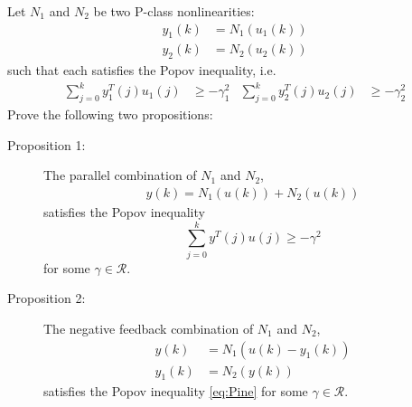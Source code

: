 \item
Let $N_1$ and $N_2$ be two P-class nonlinearities:
\begin{align*}
    y_1(k) & = N_1(u_1(k))\\
    y_2(k) & = N_2(u_2(k))
\end{align*}
such that each satisfies the Popov inequality, i.e.
\begin{align*}
    \sum_{j=0}^k y_1^T(j)u_1(j) & \geq - \gamma_1^2
        & \sum_{j=0}^k y_2^T(j)u_2(j) & \geq  - \gamma_2^2
\end{align*}
Prove the following two propositions:
\begin{description}
    \item[Proposition 1:]
    The parallel combination of $N_1$ and $N_2$,
    \begin{align*}
    y(k) = N_1(u(k)) + N_2(u(k))
    \end{align*}
    satisfies the Popov inequality
    \begin{equation}
        \label{eq:Pine}
        \sum_{j=0}^k y^T(j)u(j)  \ge  - \gamma^2
    \end{equation}
    for some $\gamma \in \mathcal{R}$.

    \item[Proposition 2:]
    The negative feedback combination  of $N_1$ and $N_2$,
    \begin{align*}
        y(k) & = N_1(u(k) - y_1(k))\\
        y_1(k) & = N_2(y(k))
    \end{align*}
    satisfies the Popov inequality \eqref{eq:Pine} for some $\gamma \in \mathcal{R}$.
\end{description} 